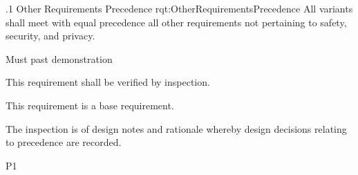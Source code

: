 \ONERQMTV
{\RqtNumberBase.1}
{Other Requirements Precedence}
{rqt:OtherRequirementsPrecedence}
{All \ThisSystem variants shall meet with equal precedence all other requirements not pertaining to safety, security, and privacy.}
{
	\item [Phase 1] Must past demonstration
}
{This requirement shall be verified by inspection.}
{
	\item [N/A] This requirement is a base requirement.
}
{
	\item The inspection is of design notes and rationale whereby design decisions relating to precedence are recorded.
}
{P1}
